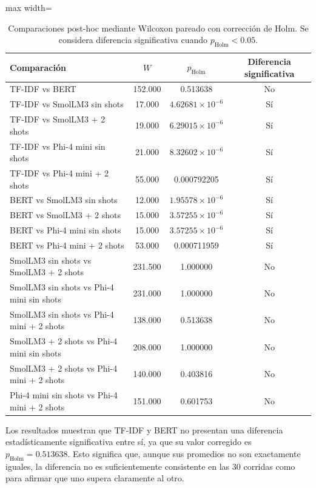 \documentclass[12pt]{article}
\begin{document}
\begin{table}[H]
\centering
\scriptsize
\begin{adjustbox}{max width=\textwidth}
\begin{tabular}{lccc}
\toprule
Comparación & $W$ & $p_{\text{Holm}}$ & Diferencia significativa \\
\midrule
TF-IDF vs BERT & 152.000 & 0.513638 & No \\
TF-IDF vs SmolLM3 sin shots & 17.000 & $4.62681 \times 10^{-6}$ & Sí \\
TF-IDF vs SmolLM3 + 2 shots & 19.000 & $6.29015 \times 10^{-6}$ & Sí \\
TF-IDF vs Phi-4 mini sin shots & 21.000 & $8.32602 \times 10^{-6}$ & Sí \\
TF-IDF vs Phi-4 mini + 2 shots & 55.000 & 0.000792205 & Sí \\
BERT vs SmolLM3 sin shots & 12.000 & $1.95578 \times 10^{-6}$ & Sí \\
BERT vs SmolLM3 + 2 shots & 15.000 & $3.57255 \times 10^{-6}$ & Sí \\
BERT vs Phi-4 mini sin shots & 15.000 & $3.57255 \times 10^{-6}$ & Sí \\
BERT vs Phi-4 mini + 2 shots & 53.000 & 0.000711959 & Sí \\
SmolLM3 sin shots vs SmolLM3 + 2 shots & 231.500 & 1.000000 & No \\
SmolLM3 sin shots vs Phi-4 mini sin shots & 231.000 & 1.000000 & No \\
SmolLM3 sin shots vs Phi-4 mini + 2 shots & 138.000 & 0.513638 & No \\
SmolLM3 + 2 shots vs Phi-4 mini sin shots & 208.000 & 1.000000 & No \\
SmolLM3 + 2 shots vs Phi-4 mini + 2 shots & 140.000 & 0.403816 & No \\
Phi-4 mini sin shots vs Phi-4 mini + 2 shots & 151.000 & 0.601753 & No \\
\bottomrule
\end{tabular}
\end{adjustbox}
\caption{Comparaciones post-hoc mediante Wilcoxon pareado con corrección de Holm. Se considera
diferencia significativa cuando $p_{\text{Holm}} < 0.05$.}
\label{tab:posthoc-wilcoxon}
\end{table}

Los resultados muestran que TF-IDF y BERT no presentan una diferencia estadísticamente
significativa entre sí, ya que su valor corregido es $p_{\text{Holm}} = 0.513638$. Esto significa
que, aunque sus promedios no son exactamente iguales, la diferencia no es suficientemente
consistente en las 30 corridas como para afirmar que uno supera claramente al otro.
\end{document}
